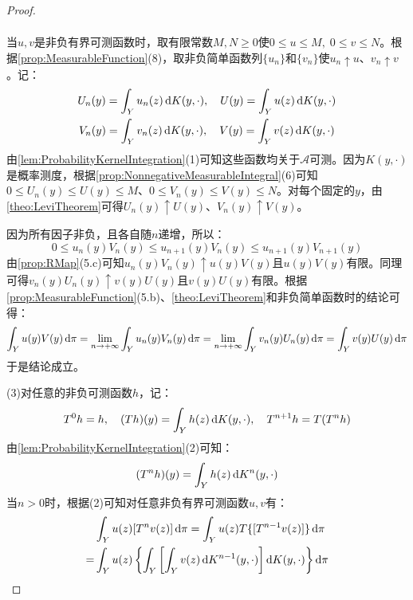 \begin{proof}
\begin{align*}
	\end{align*}\par
	当$u,v$是非负有界可测函数时，取有限常数$M,N\geqslant0$使$0\leqslant u\leqslant M,\;0\leqslant v\leqslant N$。根据\cref{prop:MeasurableFunction}(8)，取非负简单函数列$\{u_n\}$和$\{v_n\}$使$u_n\uparrow u$、$v_n\uparrow v$。记：
	\begin{gather*}
		U_n(y)=\int_{Y}u_n(z)\mathop{}\!\mathrm{d} K(y,\cdot),\quad U(y)=\int_{Y}u(z)\mathop{}\!\mathrm{d} K(y,\cdot) \\
		V_n(y)=\int_{Y}v_n(z)\mathop{}\!\mathrm{d} K(y,\cdot),\quad V(y)=\int_{Y}v(z)\mathop{}\!\mathrm{d} K(y,\cdot)
	\end{gather*}
	由\cref{lem:ProbabilityKernelIntegration}(1)可知这些函数均关于$\mathscr{A}$可测。因为$K(y,\cdot)$是概率测度，根据\cref{prop:NonnegativeMeasurableIntegral}(6)可知$0\leqslant U_n(y)\leqslant U(y)\leqslant M$、$0\leqslant V_n(y)\leqslant V(y)\leqslant N$。对每个固定的$y$，由\cref{theo:LeviTheorem}可得$U_n(y)\uparrow U(y)$、$V_n(y)\uparrow V(y)$。\par
	因为所有因子非负，且各自随$n$递增，所以：
	\begin{equation*}
		0\leqslant u_n(y)V_n(y)\leqslant u_{n+1}(y)V_n(y)\leqslant u_{n+1}(y)V_{n+1}(y)
	\end{equation*}
	由\cref{prop:RMap}(5.c)可知$u_n(y)V_n(y)\uparrow u(y)V(y)$且$u(y)V(y)$有限。同理可得$v_n(y)U_n(y)\uparrow v(y)U(y)$且$v(y)U(y)$有限。根据\cref{prop:MeasurableFunction}(5.b)、\cref{theo:LeviTheorem}和非负简单函数时的结论可得：
	\begin{equation*}
		\int_{Y}u(y)V(y)\mathop{}\!\mathrm{d}\pi=\lim_{n\to+\infty}\int_{Y}u_n(y)V_n(y)\mathop{}\!\mathrm{d}\pi=\lim_{n\to+\infty}\int_{Y}v_n(y)U_n(y)\mathop{}\!\mathrm{d}\pi=\int_{Y}v(y)U(y)\mathop{}\!\mathrm{d}\pi
	\end{equation*}
	于是结论成立。\par
	(3)对任意的非负可测函数$h$，记：
	\begin{equation*}
		T^0h=h,\quad (Th)(y)=\int_{Y}h(z)\mathop{}\!\mathrm{d} K(y,\cdot),\quad T^{n+1}h=T(T^nh)
	\end{equation*}
	由\cref{lem:ProbabilityKernelIntegration}(2)可知：
	\begin{equation*}
		(T^nh)(y)=\int_{Y}h(z)\mathop{}\!\mathrm{d} K^n(y,\cdot)
	\end{equation*}
	当$n>0$时，根据(2)可知对任意非负有界可测函数$u,v$有：
	\begin{align*}
		&\int_{Y}u(z)[T^nv(z)]\dif\pi=\int_{Y}u(z)T\{[T^{n-1}v(z)]\}\dif\pi \\
		=&\int_{Y}u(z)\left\{\int_{Y}\left[\int_{Y}v(z)\dif K^{n-1}(y,\cdot)\right]\dif K(y,\cdot)\right\}\dif\pi \\

\end{align*}
\end{proof}
